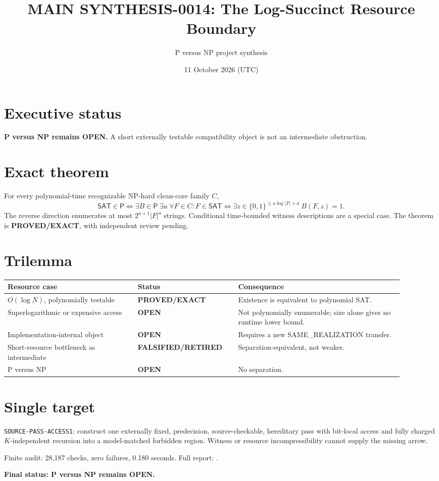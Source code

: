 \documentclass[11pt]{article}
\title{MAIN SYNTHESIS-0014: The Log-Succinct Resource Boundary}
\author{P versus NP project synthesis}
\date{11 October 2026 (UTC)}
\begin{document}
\maketitle
\section*{Executive status}
\textbf{P versus NP remains OPEN.}  A short externally testable compatibility object is not an intermediate obstruction.

\section*{Exact theorem}
For every polynomial-time recognizable NP-hard clean-core family $C$,
\[
\mathsf{SAT}\in\mathsf P
\Longleftrightarrow
\exists B\in\mathsf P\;\exists a\;\forall F\in C:
F\in\mathsf{SAT}\iff\exists z\in\{0,1\}^{\le a\log |F|+a}\ B(F,z)=1.
\]
The reverse direction enumerates at most $2^{a+1}|F|^a$ strings.  Conditional time-bounded witness descriptions are a special case.  The theorem is \textbf{PROVED/EXACT}, with independent review pending.

\section*{Trilemma}
\begin{center}\small
\begin{tabular}{p{0.30\linewidth}p{0.23\linewidth}p{0.38\linewidth}}
\toprule
Resource case & Status & Consequence\\
\midrule
$O(\log N)$, polynomially testable & \textbf{PROVED/EXACT} & Existence is equivalent to polynomial SAT.\\
Superlogarithmic or expensive access & \textbf{OPEN} & Not polynomially enumerable; size alone gives no runtime lower bound.\\
Implementation-internal object & \textbf{OPEN} & Requires a new SAME\_REALIZATION transfer.\\
Short-resource bottleneck as intermediate & \textbf{FALSIFIED/RETIRED} & Separation-equivalent, not weaker.\\
P versus NP & \textbf{OPEN} & No separation.\\
\bottomrule
\end{tabular}
\end{center}

\section*{Single target}
\texttt{SOURCE-PASS-ACCESS1}: construct one externally fixed, predecision, source-checkable, hereditary pass with bit-local access and fully charged $K$-independent recursion into a model-matched forbidden region.  Witness or resource incompressibility cannot supply the missing arrow.

Finite audit: 28,187 checks, zero failures, 0.180 seconds.  Full report:
.

\textbf{Final status: P versus NP remains OPEN.}
\end{document}
